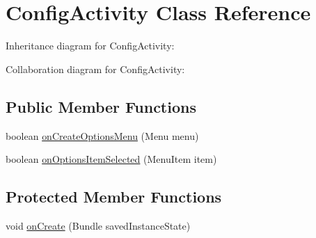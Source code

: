 \hypertarget{classcom_1_1axcoto_1_1shinjuku_1_1sushi_1_1_config_activity}{\section{\-Config\-Activity \-Class \-Reference}
\label{classcom_1_1axcoto_1_1shinjuku_1_1sushi_1_1_config_activity}
}


\-Inheritance diagram for \-Config\-Activity\-:


\-Collaboration diagram for \-Config\-Activity\-:
\subsection*{\-Public \-Member \-Functions}
\begin{DoxyCompactItemize}
\item 
boolean \hyperlink{classcom_1_1axcoto_1_1shinjuku_1_1sushi_1_1_config_activity_a8f7d87763ddaf085205a54e8477ecfce}{on\-Create\-Options\-Menu} (\-Menu menu)
\item 
boolean \hyperlink{classcom_1_1axcoto_1_1shinjuku_1_1sushi_1_1_config_activity_a37a55c533c74b60c0290ef1329d74e65}{on\-Options\-Item\-Selected} (\-Menu\-Item item)
\end{DoxyCompactItemize}
\subsection*{\-Protected \-Member \-Functions}
\begin{DoxyCompactItemize}
\item 
void \hyperlink{classcom_1_1axcoto_1_1shinjuku_1_1sushi_1_1_config_activity_a85e87cb5ced88dff7c8173ecc4f636d1}{on\-Create} (\-Bundle saved\-Instance\-State)
\end{DoxyCompactItemize}


